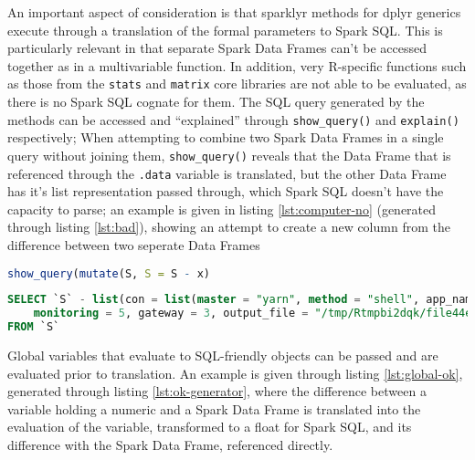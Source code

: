 \documentclass[10pt,a4paper]{article}
\begin{document}
An important aspect of consideration is that sparklyr methods for dplyr
generics execute through a translation of the formal parameters to Spark SQL.
This is particularly relevant in that separate Spark Data Frames can't be
accessed together as in a multivariable function.
In addition, very R-specific functions such as those from the \texttt{stats}
and \texttt{matrix} core libraries are not able to be evaluated, as there is no
Spark SQL cognate for them.
The SQL query generated by the methods can be accessed and ``explained''
through \texttt{show\_query()} and \texttt{explain()} respectively;
When attempting to combine two Spark Data Frames in a single query without 
joining them, \texttt{show\_query()} reveals that the Data Frame that is
referenced through the \texttt{.data} variable is translated, but the other
Data Frame has it's list representation passed through, which Spark SQL doesn't
have the capacity to parse; 
an example is given in listing \ref{lst:computer-no} (generated through listing
\ref{lst:bad}), showing an attempt to create a new column from the difference
between two seperate Data Frames

\begin{lstlisting}[language=R, caption={Attempt in R to form new column from the difference between two separate Spark data frames \texttt{S} and \texttt{x}}, label=lst:bad]
show_query(mutate(S, S = S - x)
\end{lstlisting}

\begin{lstlisting}[language=SQL, caption={Spark SQL query generated from attempt to form the difference from two seperate data frames}, label=lst:computer-no]
SELECT `S` - list(con = list(master = "yarn", method = "shell", app_name = "sparklyr", config = list(spark.env.SPARK_LOCAL_IP.local = "127.0.0.1", sparklyr.connect.csv.embedded = "\^1.*", spark.sql.legacy.utcTimestampFunc.enabled = TRUE, sparklyr.connect.cores.local = 4, spark.sql.shuffle.partitions.local = 4), state = <environment>, extensions = list(jars = character(0), packages = character(0), initializers = list(), catalog_jars = character(0)), spark_home = "/shared/spark-3.0.0-preview2-bin-hadoop3.2", backend = 4,
    monitoring = 5, gateway = 3, output_file = "/tmp/Rtmpbi2dqk/file44ec187daaf4_spark.log", sessionId = 58600, home_version = "3.0.0")) AS `S1`, `S` - list(x = "x", vars = "initial") AS `S2`
FROM `S`
\end{lstlisting}

Global variables that evaluate to SQL-friendly objects can be passed and are
evaluated prior to translation.
An example is given through listing \ref{lst:global-ok}, generated through
listing \ref{lst:ok-generator}, where the difference between a variable holding
a numeric and a Spark Data Frame is translated into the evaluation of the
variable, transformed to a float for Spark SQL, and its difference with the
Spark Data Frame, referenced directly.
\end{document}
